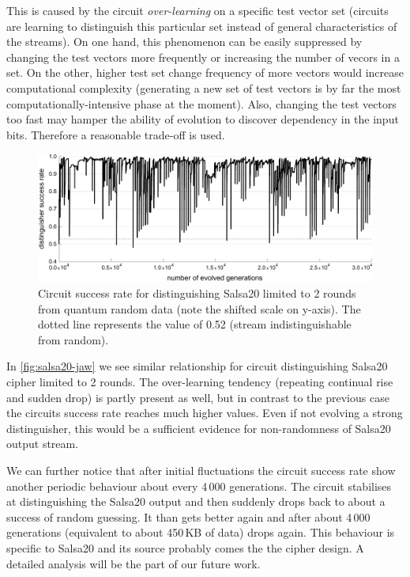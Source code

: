 \documentclass[12pt,twoside]{fithesis2}		%
\renewcommand{\_}{\leavevmode \kern0.0em\vbox{\hrule width0.4em}}
\begin{document}
This is caused by the circuit \textit{over-learning} on a specific test vector set
(circuits are learning to distinguish this particular set instead of general characteristics of the streams).
On one hand, this phenomenon can be easily suppressed by changing the test vectors more frequently or increasing the number of vecors
in a set. On the other, higher test set change frequency of more vectors 
would increase computational complexity (generating a new set of test vectors is by far
the most computationally-intensive phase at the moment).
Also, changing the test vectors too fast may hamper the ability of evolution to discover dependency in the input bits.
Therefore a reasonable trade-off is used.

\begin{figure}[t!]
\centering
\includegraphics[width=\textwidth]{images/jaw-salsa}
\caption{Circuit success rate for distinguishing Salsa20 limited to 2 rounds from quantum random data (note the shifted 
scale on y-axis). The dotted line represents the value of 0.52 (stream indistinguishable from random).}
\label{fig:salsa20-jaw}
\end{figure}

In \autoref{fig:salsa20-jaw} we see similar relationship for circuit distinguishing Salsa20 cipher limited to 2 rounds.
The over-learning tendency (repeating continual rise and sudden drop) is partly present as well, but in contrast to the previous case
the circuits success rate reaches much higher values. Even if not evolving a strong distinguisher, this would be a sufficient
evidence for non-randomness of Salsa20 output stream.

We can further notice that after initial fluctuations the circuit success rate show another periodic behaviour about every 4\,000
generations. The circuit stabilises at distinguishing the Salsa20 output and then suddenly drops back to about a success of random
guessing. It than gets better again and after about 4\,000 generations (equivalent to about 450\,KB of data) drops again.
This behaviour is specific to Salsa20 and its source probably comes the the cipher design. A detailed analysis will be
the part of our future work.
\end{document}
